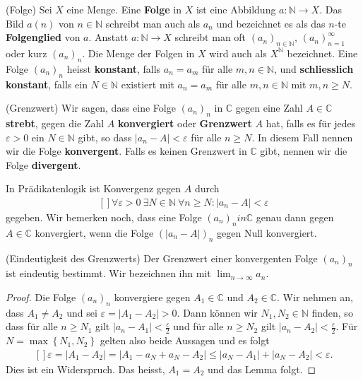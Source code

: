 \documentclass[../Analysis1_script.tex]{subfiles}
\begin{document}
\begin{definition}{(Folge)}
	Sei $X$ eine Menge. Eine \textbf{Folge} in $X$ ist eine Abbildung $a: \mathbb {N} \to X$. Das Bild $a(n)$ von $n\in \mathbb {N}$ schreibt man auch als $a_n$ und bezeichnet es als das $n$-te \textbf{Folgenglied} von $a$. Anstatt $a:\mathbb {N}\to X$ schreibt man oft $(a_n)_{n\in \mathbb {N}}$, $(a_n)_{n=1}^\infty$ oder kurz $(a_n)_{n}$. Die Menge der Folgen in $X$ wird auch als $X^{\mathbb {N}}$ bezeichnet. Eine Folge $(a_n)_n$ heisst \textbf{konstant}, falls $a_n = a_m$ für alle $m,n\in \mathbb {N}$, und \textbf{schliesslich konstant}, falls ein $N\in \mathbb {N}$ existiert mit $a_n = a_m$ für alle $m,n\in \mathbb {N}$ mit $m,n \geq N$. 
\end{definition}

\begin{definition}{(Grenzwert)}
	Wir sagen, dass eine Folge $(a_n)_{n}$ in $\mathbb {C}$ gegen eine Zahl $A\in \mathbb {C}$ \textbf{strebt}, gegen die Zahl $A$ \textbf{konvergiert} oder \textbf{Grenzwert} $A$ hat, falls es für jedes $\varepsilon >0$ ein $N \in \mathbb {N}$ gibt, so dass $|a_n-A|< \varepsilon$ für alle $n \geq N$. In diesem Fall nennen wir die Folge \textbf{konvergent}. Falls es keinen Grenzwert in $\mathbb {C}$ gibt, nennen wir die Folge \textbf{divergent}. 
\end{definition}

In Prädikatenlogik ist Konvergenz gegen $A$ durch
	\[\begin{aligned}[]
		\forall \varepsilon >0\ \exists N \in \mathbb {N}\ \forall n \geq N: |a_n - A| < \varepsilon
	\end{aligned}\]
gegeben. Wir bemerken noch, dass eine Folge $(a_n)_n in \mathbb {C}$ genau dann gegen $A \in \mathbb {C}$ konvergiert, wenn die Folge $(|a_n-A|)_n$ gegen Null konvergiert.

\begin{lemma}{(Eindeutigkeit des Grenzwerts)}
	Der Grenzwert einer konvergenten Folge $(a_n)_{n}$ ist eindeutig bestimmt. Wir bezeichnen ihn mit $\lim _{n \to \infty }a_n$.
\end{lemma}

\begin{proof}
	Die Folge $(a_n)_{n}$ konvergiere gegen $A_1\in \mathbb {C}$ und $A_2\in \mathbb {C}$. Wir nehmen an, dass $A_1 \neq A_2$ und sei $\varepsilon = |A_1-A_2|> 0$. Dann können wir $N_1,N_2 \in \mathbb {N}$ finden, so dass für alle $n \geq N_1$ gilt $|a_n - A_1|< \frac {\varepsilon }{2}$ und für alle $n \geq N_2$ gilt $|a_n - A_2|< \frac {\varepsilon }{2}$. Für $N = \max \left \lbrace {N_1,N_2} \right \rbrace$ gelten also beide Aussagen und es folgt
	\[\begin{aligned}[]
		\varepsilon = |A_1-A_2| = |A_1-a_N+a_N-A_2| \leq |a_N-A_1|+|a_N-A_2|<\varepsilon .
	\end{aligned}\]
	Dies ist ein Widerspruch. Das heisst, $A_1 = A_2$ und das Lemma folgt. 
\end{proof}
\end{document}
